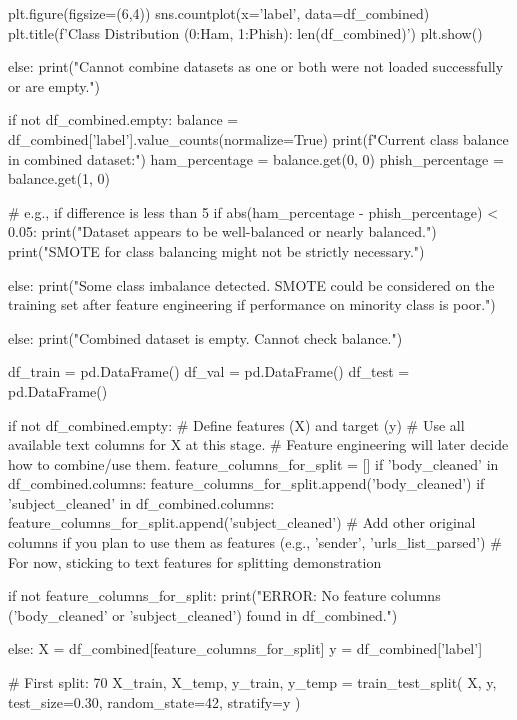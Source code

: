 \begin{ffcode}
        plt.figure(figsize=(6,4))
        sns.countplot(x='label', data=df_combined)
        plt.title(f'Class Distribution (0:Ham, 1:Phish)\nTotal: {len(df_combined)}')
        plt.show()

else:
    print("Cannot combine datasets as one or both were not loaded successfully or are empty.")

if not df_combined.empty:
    balance = df_combined['label'].value_counts(normalize=True)
    print(f"Current class balance in combined dataset:")
    ham_percentage = balance.get(0, 0)
    phish_percentage = balance.get(1, 0)

    # e.g., if difference is less than 5%
    if abs(ham_percentage - phish_percentage) < 0.05:
        print("Dataset appears to be well-balanced or nearly balanced.")
        print("SMOTE for class balancing might not be strictly necessary.")

    else:
        print("Some class imbalance detected. SMOTE could be considered on the training set after feature engineering if performance on minority class is poor.")

else:
    print("Combined dataset is empty. Cannot check balance.")

df_train = pd.DataFrame()
df_val = pd.DataFrame()
df_test = pd.DataFrame()
    
    if not df_combined.empty:
        # Define features (X) and target (y)
        # Use all available text columns for X at this stage.
        # Feature engineering will later decide how to combine/use them.
        feature_columns_for_split = []
        if 'body_cleaned' in df_combined.columns: feature_columns_for_split.append('body_cleaned')
        if 'subject_cleaned' in df_combined.columns: feature_columns_for_split.append('subject_cleaned')
        # Add other original columns if you plan to use them as features (e.g., 'sender', 'urls_list_parsed')
        # For now, sticking to text features for splitting demonstration
    
        if not feature_columns_for_split:
            print("ERROR: No feature columns ('body_cleaned' or 'subject_cleaned') found in df_combined.")
    
        else:
            X = df_combined[feature_columns_for_split]
            y = df_combined['label']
    
            # First split: 70%
            X_train, X_temp, y_train, y_temp = train_test_split(
                X, y, test_size=0.30, random_state=42, stratify=y
            )
    

\end{ffcode}
